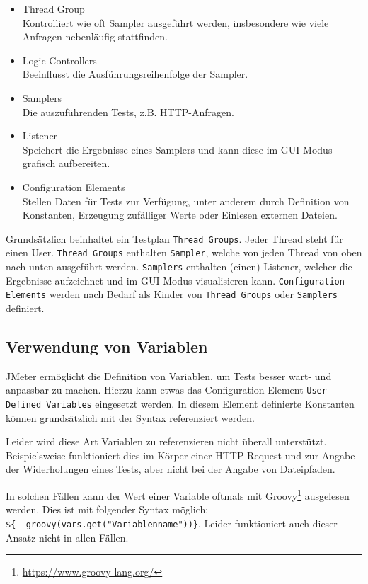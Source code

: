 \begin{itemize}
    \item Thread Group\hfill
          \\Kontrolliert wie oft Sampler ausgeführt werden, insbesondere wie viele Anfragen nebenläufig stattfinden.
    \item Logic Controllers\hfill
          \\Beeinflusst die Ausführungsreihenfolge der Sampler.
    \item Samplers\hfill
          \\Die auszuführenden Tests, z.B. HTTP-Anfragen.
    \item Listener\hfill
          \\Speichert die Ergebnisse eines Samplers und kann diese im GUI-Modus grafisch aufbereiten.
    \item Configuration Elements\hfill
          \\Stellen Daten für Tests zur Verfügung, unter anderem durch Definition von Konstanten, Erzeugung zufälliger Werte oder Einlesen externen Dateien.
\end{itemize}

Grundsätzlich beinhaltet ein Testplan \texttt{Thread Groups}.
Jeder Thread steht für einen User.
\texttt{Thread Groups} enthalten \texttt{Sampler}, welche von jeden Thread von oben nach unten ausgeführt werden.
\texttt{Samplers} enthalten (einen) Listener, welcher die Ergebnisse aufzeichnet und im GUI-Modus visualisieren kann.
\texttt{Configuration Elements} werden nach Bedarf als Kinder von \texttt{Thread Groups} oder \texttt{Samplers} definiert.


\subsection{Verwendung von Variablen}

JMeter ermöglicht die Definition von Variablen, um Tests besser wart- und anpassbar zu machen.
Hierzu kann etwas das Configuration Element \texttt{User Defined Variables} eingesetzt werden.
In diesem Element definierte Konstanten können grundsätzlich mit der Syntax  referenziert werden.

Leider wird diese Art Variablen zu referenzieren nicht überall unterstützt.
Beispielsweise funktioniert dies im Körper einer HTTP Request und zur Angabe der Widerholungen eines Tests,
aber nicht bei der Angabe von Dateipfaden.

In solchen Fällen kann der Wert einer Variable oftmals mit Groovy\footnote{\url{https://www.groovy-lang.org/}} ausgelesen werden.
Dies ist mit folgender Syntax möglich: \texttt{\$\{__groovy(vars.get("Variablenname"))\}}.
Leider funktioniert auch dieser Ansatz nicht in allen Fällen.


